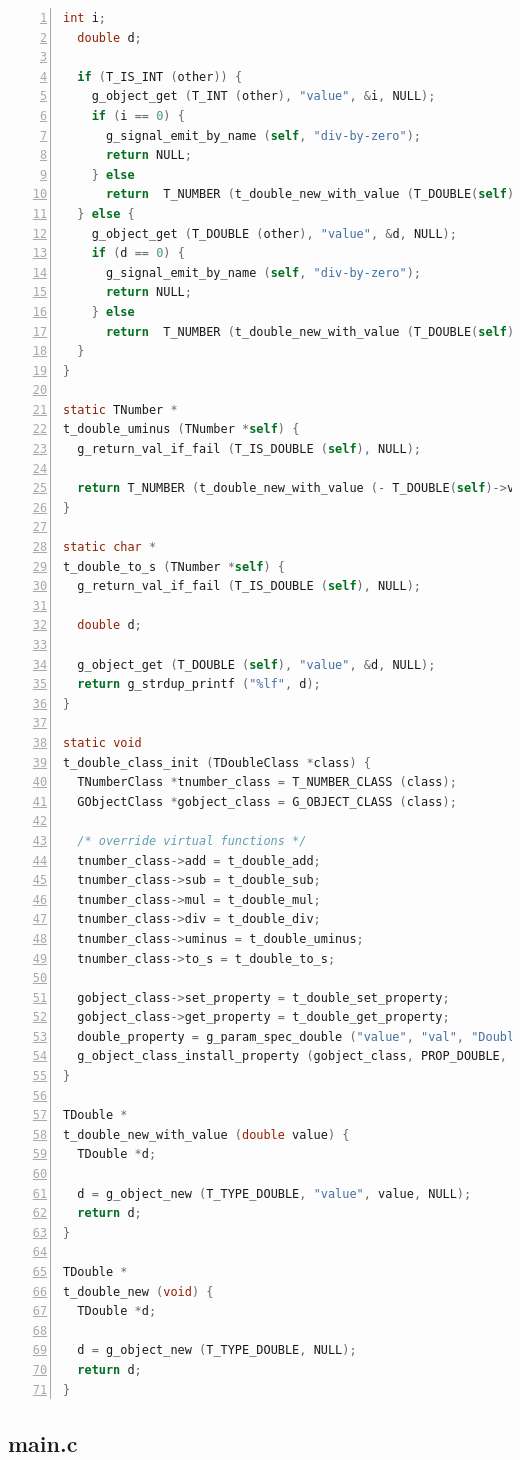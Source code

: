 \begin{lstlisting}[language=C, numbers=left]
  int i;
  double d;

  if (T_IS_INT (other)) {
    g_object_get (T_INT (other), "value", &i, NULL);
    if (i == 0) {
      g_signal_emit_by_name (self, "div-by-zero");
      return NULL;
    } else
      return  T_NUMBER (t_double_new_with_value (T_DOUBLE(self)->value / (double) i));
  } else {
    g_object_get (T_DOUBLE (other), "value", &d, NULL);
    if (d == 0) {
      g_signal_emit_by_name (self, "div-by-zero");
      return NULL;
    } else
      return  T_NUMBER (t_double_new_with_value (T_DOUBLE(self)->value / d));
  }
}

static TNumber *
t_double_uminus (TNumber *self) {
  g_return_val_if_fail (T_IS_DOUBLE (self), NULL);

  return T_NUMBER (t_double_new_with_value (- T_DOUBLE(self)->value));
}

static char *
t_double_to_s (TNumber *self) {
  g_return_val_if_fail (T_IS_DOUBLE (self), NULL);

  double d;

  g_object_get (T_DOUBLE (self), "value", &d, NULL);
  return g_strdup_printf ("%lf", d);
}

static void
t_double_class_init (TDoubleClass *class) {
  TNumberClass *tnumber_class = T_NUMBER_CLASS (class);
  GObjectClass *gobject_class = G_OBJECT_CLASS (class);

  /* override virtual functions */
  tnumber_class->add = t_double_add;
  tnumber_class->sub = t_double_sub;
  tnumber_class->mul = t_double_mul;
  tnumber_class->div = t_double_div;
  tnumber_class->uminus = t_double_uminus;
  tnumber_class->to_s = t_double_to_s;

  gobject_class->set_property = t_double_set_property;
  gobject_class->get_property = t_double_get_property;
  double_property = g_param_spec_double ("value", "val", "Double value", -G_MAXDOUBLE, G_MAXDOUBLE, 0, G_PARAM_READWRITE);
  g_object_class_install_property (gobject_class, PROP_DOUBLE, double_property);
}

TDouble *
t_double_new_with_value (double value) {
  TDouble *d;

  d = g_object_new (T_TYPE_DOUBLE, "value", value, NULL);
  return d;
}

TDouble *
t_double_new (void) {
  TDouble *d;

  d = g_object_new (T_TYPE_DOUBLE, NULL);
  return d;
}
\end{lstlisting}

\subsection{main.c}\label{main.c}

